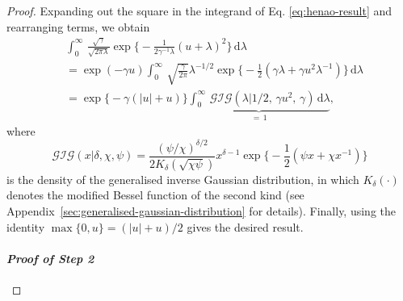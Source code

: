 \begin{proof}
Expanding out the square in the integrand of Eq. \eqref{eq:henao-result} and rearranging terms, we obtain
\begin{align}
	& \int_{0}^{\infty}\,\frac{\sqrt{\gamma}}{\sqrt{2\pi\lambda}}\exp\Big\{-\frac{1}{2\gamma^{-1}\lambda}(u+\lambda)^2\Big\}\,\mathrm{d}\lambda
	\nonumber \\	
	&= \exp(-\gamma u)\int_{0}^{\infty}\,\sqrt{\frac{\gamma}{2\pi}}\lambda^{-1/2}\exp\Big\{-\frac{1}{2}(\gamma\lambda + \gamma u^2\lambda^{-1})\Big\}\,\mathrm{d}\lambda
	\nonumber \\
	&= \exp\Big\{-\gamma(|u| + u)\Big\}
	\underbrace{\int_{0}^{\infty}\,\mathcal{GIG}(\lambda|1/2,\, \gamma u^2, \,\gamma)\,\mathrm{d}\lambda}_{=\, 1},
\end{align}
where
\begin{equation}
	\mathcal{GIG}(x|\delta, \chi, \psi)
	= \frac{(\psi/\chi)^{\delta/2}}{2K_{\delta}(\sqrt{\chi\psi})}x^{\delta-1}\exp\Big\{-\frac{1}{2}(\psi x + \chi x^{-1})\Big\}
\end{equation}
is the density of the generalised inverse Gaussian distribution, in which $K_{\delta}(\cdot)$ denotes the modified Bessel function of the second kind (see Appendix~\ref{sec:generalised-gaussian-distribution} for details).
Finally, using the identity $\max\{0, u\} = (|u| + u) / 2$ gives the desired result.

\paragraph{\it{Proof of Step 2}}


\end{proof}
